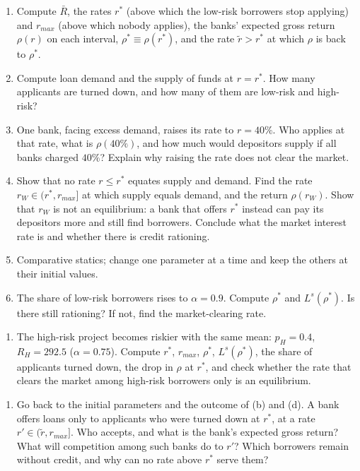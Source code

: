\documentclass[11pt,a4paper]{article}
\providecommand{\tightlist}{\setlength{\itemsep}{0pt}\setlength{\parskip}{0pt}}
\begin{document}
\begin{enumerate}
\def\labelenumi{(\alph{enumi})}
\item
  Compute \(\bar R\), the rates \(r^*\) (above which the low-risk borrowers stop applying) and
  \(r_{max}\) (above which nobody applies), the banks' expected gross return \(\rho(r)\) on each
  interval, \(\rho^* \equiv \rho(r^*)\), and the rate \(\tilde r > r^*\) at which \(\rho\) is back
  to \(\rho^*\).
\item
  Compute loan demand and the supply of funds at \(r = r^*\). How many applicants are turned down,
  and how many of them are low-risk and high-risk?
\item
  One bank, facing excess demand, raises its rate to \(r = 40\%\). Who applies at that rate, what is
  \(\rho(40\%)\), and how much would depositors supply if all banks charged \(40\%\)? Explain why
  raising the rate does not clear the market.
\item
  Show that no rate \(r \le r^*\) equates supply and demand. Find the rate
  \(r_W \in (r^*, r_{max}]\) at which supply equals demand, and the return \(\rho(r_W)\). Show that
  \(r_W\) is not an equilibrium: a bank that offers \(r^*\) instead can pay its depositors more and
  still find borrowers. Conclude what the market interest rate is and whether there is credit
  rationing.
\item
  Comparative statics; change one parameter at a time and keep the others at their initial values.
\item
  The share of low-risk borrowers rises to \(\alpha = 0.9\). Compute \(\rho^*\) and \(L^s(\rho^*)\).
  Is there still rationing? If not, find the market-clearing rate.
\end{enumerate}

\begin{enumerate}
\def\labelenumi{(\roman{enumi})}
\setcounter{enumi}{1}
\tightlist
\item
  The high-risk project becomes riskier with the same mean: \(p_H = 0.4\), \(R_H = 292.5\)
  (\(\alpha = 0.75\)). Compute \(r^*\), \(r_{max}\), \(\rho^*\), \(L^s(\rho^*)\), the share of
  applicants turned down, the drop in \(\rho\) at \(r^*\), and check whether the rate that clears
  the market among high-risk borrowers only is an equilibrium.
\end{enumerate}

\begin{enumerate}
\def\labelenumi{(\alph{enumi})}
\setcounter{enumi}{5}
\tightlist
\item
  Go back to the initial parameters and the outcome of (b) and (d). A bank offers loans only to
  applicants who were turned down at \(r^*\), at a rate \(r' \in (\tilde r, r_{max}]\). Who accepts,
  and what is the bank's expected gross return? What will competition among such banks do to \(r'\)?
  Which borrowers remain without credit, and why can no rate above \(r^*\) serve them?
\end{enumerate}
\end{document}
